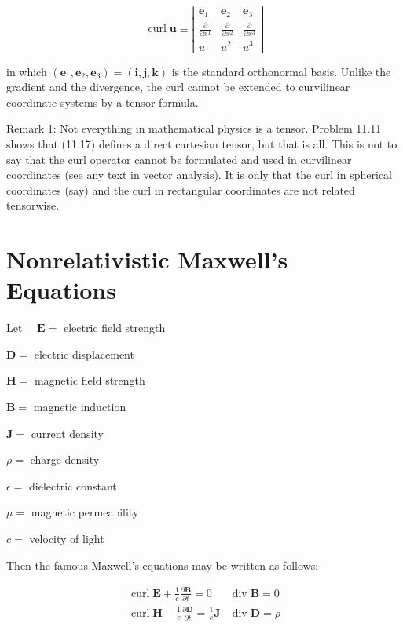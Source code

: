 \documentclass[10pt]{article}
\begin{document}
\[
\operatorname{curl} \mathbf{u} \equiv\left|\begin{array}{ccc}
\mathbf{e}_{1} & \mathbf{e}_{2} & \mathbf{e}_{3}  \tag{11.17b}\\
\frac{\partial}{\partial x^{1}} & \frac{\partial}{\partial x^{2}} & \frac{\partial}{\partial x^{3}} \\
u^{1} & u^{2} & u^{3}
\end{array}\right|
\]

in which $\left(\mathbf{e}_{1}, \mathbf{e}_{2}, \mathbf{e}_{3}\right)=(\mathbf{i}, \mathbf{j}, \mathbf{k})$ is the standard orthonormal basis. Unlike the gradient and the divergence, the curl cannot be extended to curvilinear coordinate systems by a tensor formula.

Remark 1: Not everything in mathematical physics is a tensor. Problem 11.11 shows that (11.17) defines a direct cartesian tensor, but that is all. This is not to say that the curl operator cannot be formulated and used in curvilinear coordinates (see any text in vector analysis). It is only that the curl in spherical coordinates (say) and the curl in rectangular coordinates are not related tensorwise.

\section*{Nonrelativistic Maxwell's Equations}
Let $\quad \mathbf{E}=$ electric field strength

$\mathbf{D}=$ electric displacement

$\mathbf{H}=$ magnetic field strength

$\mathbf{B}=$ magnetic induction

$\mathbf{J}=$ current density

$\rho=$ charge density

$\epsilon=$ dielectric constant

$\mu=$ magnetic permeability

$c=$ velocity of light

Then the famous Maxwell's equations may be written as follows:

\[
\begin{array}{ll}
\operatorname{curl} \mathbf{E}+\frac{1}{c} \frac{\partial \mathbf{B}}{\partial t}=0 & \operatorname{div} \mathbf{B}=0  \tag{11.18}\\
\operatorname{curl} \mathbf{H}-\frac{1}{c} \frac{\partial \mathbf{D}}{\partial t}=\frac{1}{c} \mathbf{J} & \operatorname{div} \mathbf{D}=\rho
\end{array}
\]
\end{document}
